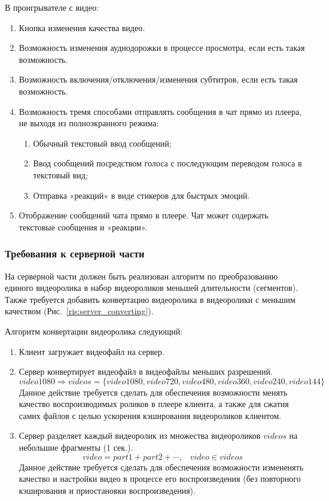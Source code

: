 В проигрывателе с видео:
\begin{enumerate}[noitemsep]
    \item Кнопка изменения качества видео.
    \item Возможность изменения аудиодорожки в процессе просмотра, если есть такая возможность.
    \item Возможность включения/отключения/изменения субтитров, если есть такая возможность.
    \item Возможность тремя способами отправлять сообщения в чат прямо из плеера, не выходя из полноэкранного режима:
    \begin{enumerate}
        \item Обычный текстовый ввод сообщений;
        \item Ввод сообщений посредством голоса с последующим переводом голоса в текстовый вид;
        \item Отправка «реакций» в виде стикеров для быстрых эмоций.
    \end{enumerate}
    \item Отображение сообщений чата прямо в плеере.
    Чат может содержать текстовые сообщения и «реакции».
\end{enumerate}

\newpage

\subsubsection{Требования к серверной части}
На серверной части должен быть реализован алгоритм по преобразованию единого видеоролика в набор видеороликов меньшей длительности
(сегментов).
Также требуется добавить конвертацию видеоролика в видеоролики с меньшим качеством (Рис.~\ref{ris:server_converting}).

Алгоритм конвертации видеоролика следующий:
\begin{enumerate}
    \item Клиент загружает видеофайл на сервер.
    \item Сервер конвертирует видеофайл в видеофайлы меньших разрешений.
    \[ video1080 \Rightarrow videos = \{ video1080, video720, video480, video360, video240, video144 \} \]
    Данное действие требуется сделать для обеспечения возможности менять качество воспроизводимых роликов в плеере клиента,
    а также для сжатия самих файлов с целью ускорения кэширования видеороликов клиентом.
    \item Сервер разделяет каждый видеоролик из множества видеороликов \(videos\) на небольшие фрагменты (1 сек.).
    \[ video = part1 + part2 + \cdots, \;\;\; video \in videos \]
    Данное действие требуется сделать для обеспечения возможности измененять качество и настройки видео в процессе его воспроизведения
    (без повторного кэширования и приостановки воспроизведения).
\end{enumerate}

